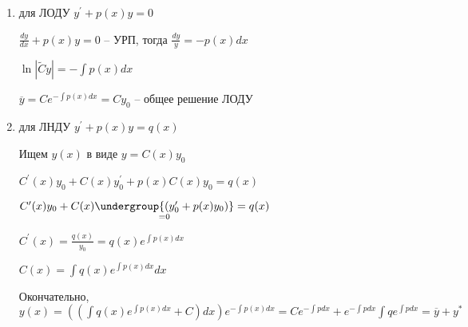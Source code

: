 \documentclass[12pt]{article}
\begin{document}
    \begin{enumerate}
        \item для ЛОДУ $y^\prime + p(x)y = 0$

        $\frac{dy}{dx} + p(x)y = 0$ -- УРП, тогда $\frac{dy}{y} = -p(x)dx$

        $\ln|\tilde{C}y| = -\int p(x)dx$

        $\overline{y} = Ce^{-\int p(x) dx} = Cy_0$ -- общее решение ЛОДУ

        \item для ЛНДУ $y^\prime + p(x)y = q(x)$

        Ищем $y(x)$ в виде $y = C(x)y_0$

        $C^\prime(x)y_0 + C(x)y^\prime_0 + p(x)C(x)y_0 = q(x)$

        $C^\prime(x)y_0 + C(x)\underset{=0}{\undergroup{(y^\prime_0 + p(x)y_0)}} = q(x)$

        $C^\prime(x) = \frac{q(x)}{y_0} = q(x)e^{\int p(x)dx}$

        $C(x) = \int q(x) e^{\int p(x)dx} dx$

        Окончательно, $y(x) = \left(\left(\int q(x) e^{\int p(x)dx} + C\right) dx\right) e^{-\int p(x) dx} =
        Ce^{-\int p dx} + e^{-\int pdx} \int q e^{\int p dx} = \overline{y} + y^*$
    \end{enumerate}
\end{document}
